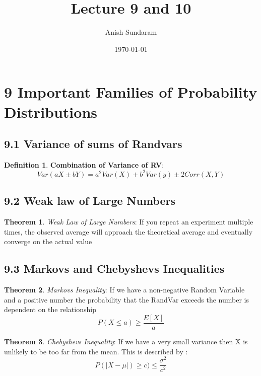 \documentclass[12pt]{amsart}
\title{Lecture 9 and 10}
\author{Anish Sundaram}
\date{\today}
\theoremstyle{definition}
\newtheorem{theorem}{Theorem}  %
\newtheorem{definition}{Definition} %
\numberwithin{equation}{theorem}    %
\begin{document}
\maketitle

\tableofcontents

\section*{9 Important Families of Probability Distributions}
\subsection*{9.1 Variance of sums of Randvars}

\begin{definition}
    \textbf{Combination of Variance of RV}:
    $$Var(aX \pm bY) = a^2Var(X)+b^2Var(y) \pm 2Corr(X,Y)$$
\end{definition}


\subsection*{9.2 Weak law of Large Numbers}

\begin{theorem}
    \textit{Weak Law of Large Numbers}:
    If you repeat an experiment multiple times, the observed average will
    approach the theoretical average and eventually converge on the actual value
\end{theorem}

\subsection*{9.3 Markovs and Chebyshevs Inequalities}

\begin{theorem}
    \textit{Markovs Inequality}:
    If we have a non-negative Random Variable and a positive number the probability that the RandVar exceeds the number is dependent on the relationship $$P(X \leq a) \geq \frac{E[X]}{a}$$

\end{theorem}

\begin{theorem}
    \textit{Chebyshevs Inequality}:
    If we have a very small variance then X is unlikely to be too far from the mean. This is described by :
    $$P(|X-\mu|) \geq c) \leq \frac{\sigma^2}{c^2}$$
\end{theorem}
\end{document}
